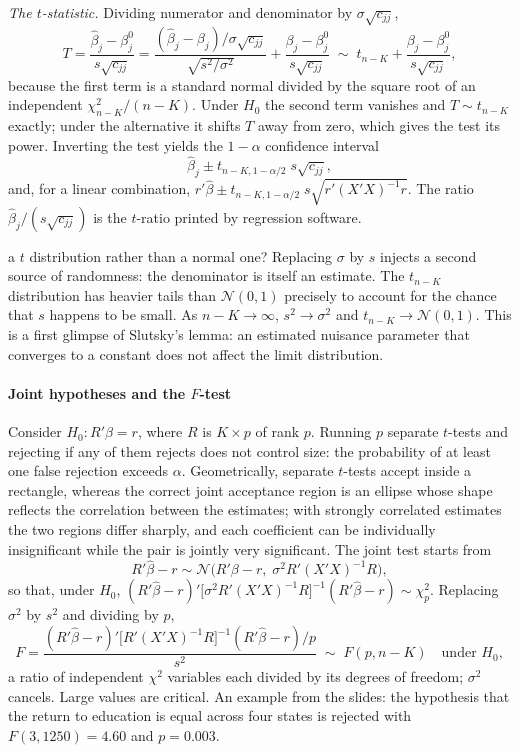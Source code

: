 \documentclass[11pt,a4paper]{article}
\newcommand{\N}{\mathcal{N}}
\newcommand{\bh}{\hat\beta}
\begin{document}
\emph{The $t$-statistic.} Dividing numerator and denominator by $\sigma\sqrt{c_{jj}}$,
\begin{equation}\label{eq:t}
T=\frac{\bh_j-\beta_j^0}{s\sqrt{c_{jj}}}=\frac{(\bh_j-\beta_j)\big/\sigma\sqrt{c_{jj}}}{\sqrt{s^2/\sigma^2}}+\frac{\beta_j-\beta_j^0}{s\sqrt{c_{jj}}}
\;\sim\; t_{n-K}+\frac{\beta_j-\beta_j^0}{s\sqrt{c_{jj}}},
\end{equation}
because the first term is a standard normal divided by the square root of an independent $\chi^2_{n-K}/(n-K)$. Under $H_0$ the second term vanishes and $T\sim t_{n-K}$ exactly; under the alternative it shifts $T$ away from zero, which gives the test its power. Inverting the test yields the $1-\alpha$ confidence interval
\[
\bh_j\pm t_{n-K,1-\alpha/2}\;s\sqrt{c_{jj}},
\]
and, for a linear combination, $r'\bh\pm t_{n-K,1-\alpha/2}\;s\sqrt{r'(X'X)^{-1}r}$. The ratio $\bh_j/(s\sqrt{c_{jj}})$ is the $t$-ratio printed by regression software.

\begin{whybox}{a $t$ distribution rather than a normal one?}
Replacing $\sigma$ by $s$ injects a second source of randomness: the denominator is itself an estimate. The $t_{n-K}$ distribution has heavier tails than $\N(0,1)$ precisely to account for the chance that $s$ happens to be small. As $n-K\to\infty$, $s^2\to\sigma^2$ and $t_{n-K}\to\N(0,1)$. This is a first glimpse of Slutsky's lemma: an estimated nuisance parameter that converges to a constant does not affect the limit distribution.
\end{whybox}

\paragraph{Joint hypotheses and the $F$-test}
Consider $H_0\colon R'\beta=r$, where $R$ is $K\times p$ of rank $p$. Running $p$ separate $t$-tests and rejecting if any of them rejects does not control size: the probability of at least one false rejection exceeds $\alpha$. Geometrically, separate $t$-tests accept inside a rectangle, whereas the correct joint acceptance region is an ellipse whose shape reflects the correlation between the estimates; with strongly correlated estimates the two regions differ sharply, and each coefficient can be individually insignificant while the pair is jointly very significant. The joint test starts from
\[
R'\bh-r\sim\N\big(R'\beta-r,\;\sigma^2R'(X'X)^{-1}R\big),
\]
so that, under $H_0$, $(R'\bh-r)'\big[\sigma^2R'(X'X)^{-1}R\big]^{-1}(R'\bh-r)\sim\chi^2_p$. Replacing $\sigma^2$ by $s^2$ and dividing by $p$,
\begin{equation}\label{eq:F}
F = \frac{(R'\bh-r)'\big[R'(X'X)^{-1}R\big]^{-1}(R'\bh-r)\big/p}{s^2}\;\sim\; F(p,n-K)\quad\text{under }H_0,
\end{equation}
a ratio of independent $\chi^2$ variables each divided by its degrees of freedom; $\sigma^2$ cancels. Large values are critical. An example from the slides: the hypothesis that the return to education is equal across four states is rejected with $F(3,1250)=4.60$ and $p=0.003$.
\end{document}

